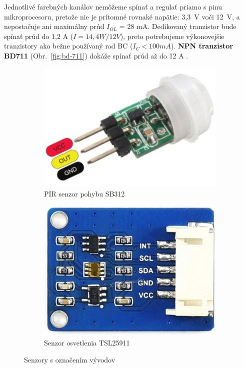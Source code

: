 \documentclass[12pt, a4paper]{article}
\begin{document}
Jednotlivé farebných kanálov nemôžeme spínať a regulať priamo s pinu mikroprocesoru, pretože nie je prítomné rovnaké napätie: 3,3~V voči 12~V, a nepostačuje ani maximálny prúd $I_{OL}$ = 28 mA. Dedikovaný tranzistor bude spínať prúd do 1,2 A ($I = 14,4W / 12V$), preto potrebujeme výkonovejšie tranzistory ako bežne používaný rad BC ($I_C < 100 mA$). \textbf{NPN tranzistor BD711} (Obr.~\ref{fig:bd-711}) dokáže spínať prúd až do 12 A \cite{noauthor_bd711_nodate}.

\begin{figure}[h]
\centering
\begin{subfigure}[b]{0.4\textwidth}
	\centering
	\includegraphics[width=\textwidth]{assets/pir-sb312.jpg}
	\caption{PIR senzor pohybu SB312}
	\label{fig:pir}
\end{subfigure}
\hfill
\begin{subfigure}[b]{0.4\textwidth}
	\centering
	\includegraphics[width=\textwidth]{assets/tsl25911.jpg}
	\caption{Senzor osvetlenia TSL25911}
	\label{fig:light-sensor}
\end{subfigure}
\caption{Senzory s označením vývodov}
\end{figure}
\end{document}
